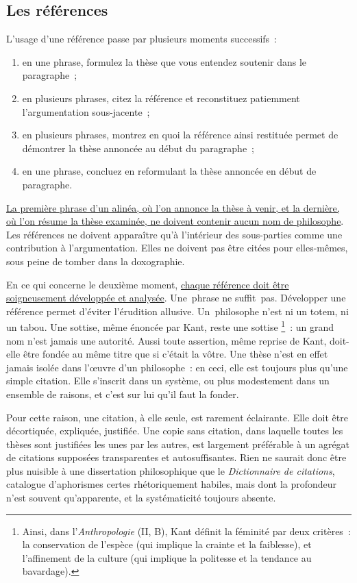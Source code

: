 \documentclass[a4paper,12pt]{report}
\begin{document}
\subsection{Les références}
\label{sec:org35e5187}

L'usage d'une référence passe par plusieurs moments successifs :

\begin{enumerate}
\item en une phrase, formulez la thèse que vous entendez soutenir dans le
paragraphe ;
\item en plusieurs phrases, citez la référence et reconstituez patiemment
l'argumentation sous-jacente ;
\item en plusieurs phrases, montrez en quoi la référence ainsi restituée
permet de démontrer la thèse annoncée au début du paragraphe ;
\item en une phrase, concluez en reformulant la thèse annoncée en début de
paragraphe.
\end{enumerate}

\uline{La première phrase d'un alinéa, où l'on annonce la thèse à venir, et la
dernière, où l'on résume la thèse examinée, ne doivent contenir aucun
nom de philosophe}. Les références ne doivent apparaître qu'à
l'intérieur des sous-parties comme une contribution à l'argumentation.
Elles ne doivent pas être citées pour elles-mêmes, sous peine de tomber
dans la doxographie.

En ce qui concerne le deuxième moment, \uline{chaque référence doit être
soi\-gneu\-sement développée et analysée}. Une phrase ne suffit pas.
Développer une référence permet d'éviter l'érudition allusive.
Un philosophe n'est ni un totem, ni un tabou. Une sottise, même énoncée
par Kant, reste une sottise \footnote{Ainsi, dans l'\emph{Anthropologie} (II, B), Kant définit la féminité par
deux critères : la conservation de l'espèce (qui implique la crainte
et la faiblesse), et l'affinement de la culture (qui implique la
politesse et la tendance au bavardage).} : un grand nom n'est jamais une
autorité. Aussi toute assertion, même reprise de Kant, doit-elle être
fondée au même titre que si c'était la vôtre. Une thèse n'est en effet
jamais isolée dans l'œuvre d'un philosophe : en ceci, elle est toujours
plus qu'une simple citation. Elle s'inscrit dans un système, ou plus
modestement dans un ensemble de raisons, et c'est sur lui qu'il faut la
fonder.

Pour cette raison, une citation, à elle seule, est rarement éclairante.
Elle doit être décortiquée, expliquée, justifiée. Une copie sans
citation, dans laquelle toutes les thèses sont justifiées les unes par
les autres, est largement préférable à un agrégat de citations supposées
transparentes et autosuffisantes. Rien ne saurait donc être plus
nuisible à une dissertation philosophique que le \emph{Dictionnaire de
citations}, catalogue d'aphorismes certes rhétoriquement habiles, mais
dont la profondeur n'est souvent qu'apparente, et la systématicité
toujours absente.
\end{document}
